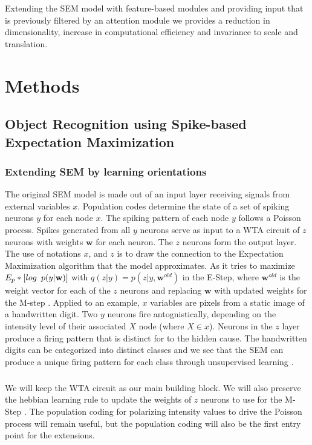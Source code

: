 \documentclass{report}
\begin{document}
Extending the SEM model with feature-based modules and providing input that is previously filtered by an attention module we provides a reduction in dimensionality, increase in computational efficiency and invariance to scale and translation.

\chapter{Methods}
\section{Object Recognition using Spike-based Expectation Maximization}

\subsection{Extending SEM by learning orientations}

The original SEM model is made out of an input layer receiving signals from external variables $x$. Population codes determine the state of a set of spiking neurons $y$ for each node $x$. The spiking pattern of each node $y$ follows a Poisson process. Spikes generated from all $y$ neurons serve as input to a WTA circuit of $z$ neurons with weights $\textbf{w}$ for each neuron. The $z$ neurons form the output layer. The use of notations $x$, and $z$ is to draw the connection to the Expectation Maximization algorithm that the model approximates. As it tries to maximize $E_p*[log \hspace{5 pt} p(y|\textbf{w})]$ with $q(z|y)=p(z|y,\textbf{w}^{old})$ in the E-Step, where $\textbf{w}^{old}$ is the weight vector for each of the $z$ neurons and replacing $\textbf{w}$ with updated weights for the M-step \cite{Nessler2010, Nessler2013, Habenschuss2013}.
Applied to an example, $x$ variables are pixels from a static image of a handwritten digit. Two $y$ neurons fire antognistically, depending on the intensity level of their associated $X$ node (where $X\in x$). Neurons in the $z$ layer produce a firing pattern that is distinct for to the hidden cause. The handwritten digits can be categorized into distinct classes and we see that the SEM can produce a unique firing pattern for each class through unsupervised learning \cite{Nessler2010}. 

\paragraph{}We will keep the WTA circuit as our main building block. We will also preserve the hebbian learning rule to update the weights of $z$ neurons to use for the M-Step \cite{Nessler2010}. The population coding for polarizing intensity values to drive the Poisson process will remain useful, but the population coding will also be the first entry point for the extensions.
\end{document}
